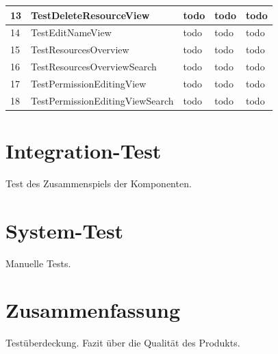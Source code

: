 \documentclass[parskip=full,11pt]{scrartcl}
\begin{document}
\begin{longtable}[c]{|l|l|l|l|l|}
13 & TestDeleteResourceView 
& todo %
& todo %
& todo	%
\\ \hline

14 & TestEditNameView
& todo %
& todo %
& todo	%
\\ \hline

15 & TestResourcesOverview
& todo %
& todo %
& todo	%
\\ \hline

16 & TestResourcesOverviewSearch
& todo %
& todo %
& todo	%
\\ \hline

17 & TestPermissionEditingView
& todo %
& todo %
& todo	%
\\ \hline

18 & TestPermissionEditingViewSearch 
& todo %
& todo %
& todo	%
\\ \hline
\end{longtable}
\newpage


\section{Integration-Test}
Test des Zusammenspiels der Komponenten.

\newpage
\section{System-Test}
Manuelle Tests.

\newpage
\section{Zusammenfassung}
Testüberdeckung. Fazit über die Qualität des Produkts.
\end{document}
